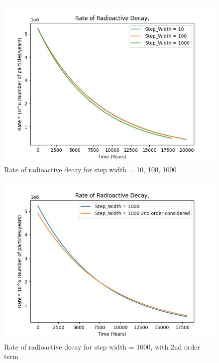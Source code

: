 \documentclass[11pt]{article}
\begin{document}
\begin{figure}[b]
    \centering
    \includegraphics[width=\textwidth, height=\textheight, keepaspectratio]{Carbon_plot_10_100_1000.jpeg}
    \caption{Rate of radioactive decay for step width = 10, 100, 1000}
    \label{fig:Rate of radioactive decay for step width = 10, 100, 1000}
\end{figure}

\begin{figure}[b]
    \centering
    \includegraphics[width=\textwidth, height=\textheight, keepaspectratio]{Carbon_plot_1000_with 2nd order.jpeg}
    \caption{Rate of radioactive decay for step width = 1000, with 2nd order term}
    \label{fig:Rate of radioactive decay for step width = 1000, with 2nd order term}
\end{figure}
\end{document}
